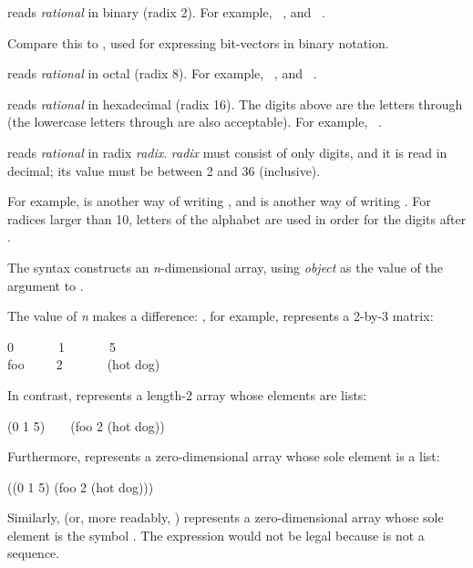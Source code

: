 \begin{flushdesc}
\item[\cd{\#B}]
 reads {\it rational} in binary (radix 2).
For example,  \EQ\ , and  \EQ\ .
\begin{new}
Compare this to \cd{\#*}, used for expressing bit-vectors in binary notation.
\end{new}

\item[\cd{\#O}]
 reads {\it rational} in octal (radix 8).
For example,  \EQ\ , and  \EQ\ .

\item[\cd{\#X}]
 reads {\it rational} in hexadecimal (radix 16).
The digits above  are the letters  through  (the lowercase
letters  through  are also acceptable).  For example,
 \EQ\ .

\item[\cd{\#{\it n}R}]
 reads {\it rational} in radix {\it radix}.
{\it radix} must consist of only digits, and
it is read in decimal; its value must be between 2 and 36 (inclusive).


For example,  is another way of writing , and 
is another way of writing .  For radices larger than 10, letters of
the alphabet are used in order for the digits after .

\item[\cd{\#{\it n}A}]
The syntax  constructs an {\it n}-dimensional array,
using {\it object} as the value of the  argument
to .

The value of {\it n} makes a difference:
, for example, represents a 2-by-3 matrix:
\begin{lisp}
0~~~~~~~1~~~~~~~5 \\
foo~~~~~2~~~~~~~(hot dog)
\end{lisp}
In contrast,  represents a length-2
array whose elements are lists:
\begin{lisp}
(0 1 5)~~~~(foo 2 (hot dog))
\end{lisp}
Furthermore,  represents a zero-dimensional
array whose sole element is a list:
\begin{lisp}
((0 1 5) (foo 2 (hot dog)))
\end{lisp}
Similarly,  (or, more readably, ) represents
a zero-dimensional array whose sole element is the symbol .
The expression  would not be legal because  is
not a sequence.


\end{flushdesc}
